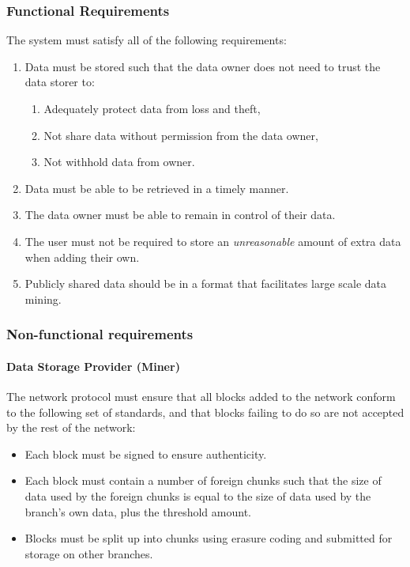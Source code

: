 \documentclass[]{article}
\let\oldparagraph\paragraph
\renewcommand{\paragraph}[1]{\oldparagraph{#1}\mbox{}}
\begin{document}
\hypertarget{header-n38}{%
\subsubsection{Functional Requirements}\label{header-n38}}

The system must satisfy all of the following requirements:

\begin{enumerate}
\def\labelenumi{\arabic{enumi}.}
\item
  Data must be stored such that the data owner does not need to trust
  the data storer to:

  \begin{enumerate}
  \def\labelenumii{\arabic{enumii}.}
  \item
    Adequately protect data from loss and theft,
  \item
    Not share data without permission from the data owner,
  \item
    Not withhold data from owner.
  \end{enumerate}
\item
  Data must be able to be retrieved in a timely manner.
\item
  The data owner must be able to remain in control of their data.
\item
  The user must not be required to store an \emph{unreasonable} amount
  of extra data when adding their own.
\item
  Publicly shared data should be in a format that facilitates large
  scale data mining.
\end{enumerate}

\hypertarget{header-n58}{%
\subsubsection{Non-functional requirements}\label{header-n58}}

\hypertarget{header-n59}{%
\paragraph{Data Storage Provider (Miner)}\label{header-n59}}

The network protocol must ensure that all blocks added to the network
conform to the following set of standards, and that blocks failing to do
so are not accepted by the rest of the network:

\begin{itemize}
\item
  Each block must be signed to ensure authenticity.
\item
  Each block must contain a number of foreign chunks such that the size
  of data used by the foreign chunks is equal to the size of data used
  by the branch's own data, plus the threshold amount.
\item
  Blocks must be split up into chunks using erasure coding and submitted
  for storage on other branches.
\end{itemize}
\end{document}
